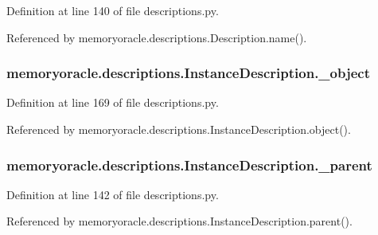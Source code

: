 Definition at line 140 of file descriptions.\+py.



Referenced by memoryoracle.\+descriptions.\+Description.\+name().

\hypertarget{classmemoryoracle_1_1descriptions_1_1InstanceDescription_ac6bc09c17d37664dd03251f1ebccc724}{}
\subsubsection[{\+\_\+object}]{\setlength{\rightskip}{0pt plus 5cm}memoryoracle.\+descriptions.\+Instance\+Description.\+\_\+object\hspace{0.3cm}{\ttfamily [private]}}\label{classmemoryoracle_1_1descriptions_1_1InstanceDescription_ac6bc09c17d37664dd03251f1ebccc724}


Definition at line 169 of file descriptions.\+py.



Referenced by memoryoracle.\+descriptions.\+Instance\+Description.\+object().

\hypertarget{classmemoryoracle_1_1descriptions_1_1InstanceDescription_aa814f3c9e403a29ebdc8c41eba7be20d}{}
\subsubsection[{\+\_\+parent}]{\setlength{\rightskip}{0pt plus 5cm}memoryoracle.\+descriptions.\+Instance\+Description.\+\_\+parent\hspace{0.3cm}{\ttfamily [private]}}\label{classmemoryoracle_1_1descriptions_1_1InstanceDescription_aa814f3c9e403a29ebdc8c41eba7be20d}


Definition at line 142 of file descriptions.\+py.



Referenced by memoryoracle.\+descriptions.\+Instance\+Description.\+parent().

\hypertarget{classmemoryoracle_1_1descriptions_1_1InstanceDescription_afe67235ea54bc1c61f31ce9a9cb95a4b}{}
